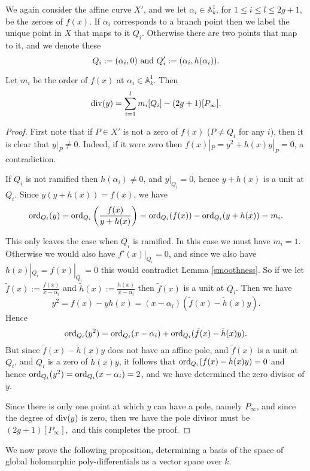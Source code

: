 We again consider the affine curve $X'$, and we let $\alpha_i \in \mathbb A_k^1$, for $1\leq i\leq l \leq 2g+1$, be the zeroes of $f(x)$.
If $\alpha_i$ corresponds to a branch point then we label the unique point in $X$ that maps to it $Q_i$.
Otherwise there are two points that map to it, and we denote these \[ Q_i:=(\alpha_i,0)\ {\rm and}\ Q_i':=(\alpha_i,h(\alpha_i)).\]


\begin{lem}\label{ychar2}
Let $m_i$ be the order of $f(x)$ at $\alpha_i\in \mathbb A_k^1$.
Then 
\[
\operatorname{div}(y) = \sum_{i=1}^l m_i[Q_i] - (2g+1)[P_\infty].
\]

\end{lem}
\begin{proof}
First note that if $P\in X'$ is not a zero of $f(x)$ (\ie $P\neq Q_i$ for any $i$), then it is clear that $y|_P \neq 0$.
Indeed, if it were zero then $f(x)|_P = y^2 + h(x)y|_P = 0$, a contradiction.

If $Q_i$ is not ramified then $h(\alpha_i) \neq 0$, and $y|_{Q_i} = 0$, hence $y+h(x)$ is a unit at $Q_i$.
Since $y(y+h(x)) = f(x)$, we have
\[
\operatorname{ord}_{Q_i}(y) = \operatorname{ord}_{Q_i}\left(\frac{f(x)}{y+h(x)}\right) = \operatorname{ord}_{Q_i}(f(x)) -\operatorname{ord}_{Q_i}(y+h(x)) = m_i.
\]

This only leaves the case when $Q_i$ is ramified. 
In this case we must have $m_i=1$.
Otherwise we would also have $f'(x)|_{Q_i} = 0$, and since we also have $h(x)|_{Q_i} = f(x)|_{Q_i} = 0$ this would contradict Lemma \ref{smoothness}.
So if we let $\tilde f(x) := \frac{f(x)}{x-\alpha_i}$ and $\tilde h(x) := \frac{h(x)}{x-\alpha_i}$ then $\tilde f(x)$ is a unit at $Q_i$.
Then we have \[y^2 = f(x) - yh(x) = (x-\alpha_i)(\tilde f(x) - \tilde h(x)y).\]
Hence
\[
\operatorname{ord}_{Q_i}(y^2) = \operatorname{ord}_{Q_i}(x-\alpha_i) + \operatorname{ord}_{Q_i}(\tilde f(x) - \tilde h(x)y).
\]
But since $\tilde f(x) - \tilde h(x) y$ does not have an affine pole, and $\tilde f(x)$ is a unit at $Q_i$, and $Q_i$ is a zero of $\tilde h(x) y$, it follows that $\operatorname{ord}_{Q_i}(\tilde f(x) -  \tilde h(x) y) = 0$
and hence $\operatorname{ord}_{Q_i}(y^2) = \operatorname{ord}_{Q_i}(x-\alpha_i) = 2$, and we have determined the zero divisor of $y$.

Since there is only one point at which $y$ can have a pole, namely $P_\infty$, and since the degree of $\operatorname{div} (y)$ is zero, then we have the pole divisor must be
$
(2g+1)[P_\infty],
$
and this completes the proof.
\end{proof}



We now prove the following proposition, determining a basis of the space of global holomorphic poly-differentials as a vector space over $k$.

